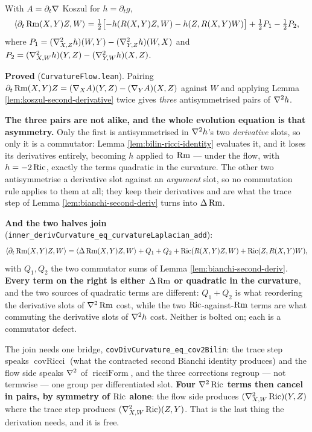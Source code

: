 \begin{lemma}
  \label{lem:first-variation-rm}
  \leanok
  With $A = \partial_t\nabla$ Koszul for $h = \partial_t g$,
  \[
    \langle \partial_t\operatorname{Rm}(X,Y)Z, W\rangle
      = \tfrac12\bigl[-h(R(X,Y)Z,W) - h(Z,R(X,Y)W)\bigr]
        + \tfrac12 P_1 - \tfrac12 P_2,
  \]
  where $P_1 = (\nabla^2_{X,Z}h)(W,Y) - (\nabla^2_{Y,Z}h)(W,X)$ and
  $P_2 = (\nabla^2_{X,W}h)(Y,Z) - (\nabla^2_{Y,W}h)(X,Z)$.

  \textbf{Proved} (\texttt{CurvatureFlow.lean}). Pairing
  $\partial_t\operatorname{Rm}(X,Y)Z = (\nabla_X A)(Y,Z) - (\nabla_Y A)(X,Z)$ against $W$ and applying
  Lemma \ref{lem:koszul-second-derivative} twice gives \emph{three} antisymmetrised
  pairs of $\nabla^2 h$.

  \textbf{The three pairs are not alike, and the whole evolution equation is that
  asymmetry.} Only the first is antisymmetrised in $\nabla^2h$'s two \emph{derivative}
  slots, so only it is a commutator: Lemma \ref{lem:bilin-ricci-identity} evaluates
  it, and it loses its derivatives entirely, becoming $h$ applied to $\operatorname{Rm}$ --- under
  the flow, with $h = -2\operatorname{Ric}$, exactly the terms quadratic in the curvature. The
  other two antisymmetrise a derivative slot against an \emph{argument} slot, so no
  commutation rule applies to them at all; they keep their derivatives and are what
  the trace step of Lemma \ref{lem:bianchi-second-deriv} turns into $\Delta\operatorname{Rm}$.

  \textbf{And the two halves join} (\texttt{inner\_derivCurvature\_eq\_curvatureLaplacian\_add}):
  \[
    \langle \partial_t\operatorname{Rm}(X,Y)Z, W\rangle = \langle \Delta\operatorname{Rm}(X,Y)Z, W\rangle
      + Q_1 + Q_2 + \operatorname{Ric}(R(X,Y)Z,W) + \operatorname{Ric}(Z,R(X,Y)W),
  \]
  with $Q_1,Q_2$ the two commutator sums of Lemma \ref{lem:bianchi-second-deriv}.
  \textbf{Every term on the right is either $\Delta\operatorname{Rm}$ or quadratic in the
  curvature}, and the two sources of quadratic terms are different: $Q_1+Q_2$ is what
  reordering the derivative slots of $\nabla^2\operatorname{Rm}$ cost, while the two
  $\operatorname{Ric}$-against-$\operatorname{Rm}$ terms are what commuting the derivative slots of $\nabla^2h$
  cost. Neither is bolted on; each is a commutator defect.

  The join needs one bridge, \texttt{covDivCurvature\_eq\_cov2Bilin}: the trace step
  speaks $\operatorname{covRicci}$ (what the contracted second Bianchi identity
  produces) and the flow side speaks $\nabla^2$ of $\operatorname{ricciForm}$, and the
  three corrections regroup --- not termwise --- one group per differentiated slot.
  \textbf{Four $\nabla^2\operatorname{Ric}$ terms then cancel in pairs, by symmetry of $\operatorname{Ric}$
  alone}: the flow side produces $(\nabla^2_{X,W}\operatorname{Ric})(Y,Z)$ where the trace step
  produces $(\nabla^2_{X,W}\operatorname{Ric})(Z,Y)$. That is the last thing the derivation needs,
  and it is free.
\end{lemma}

